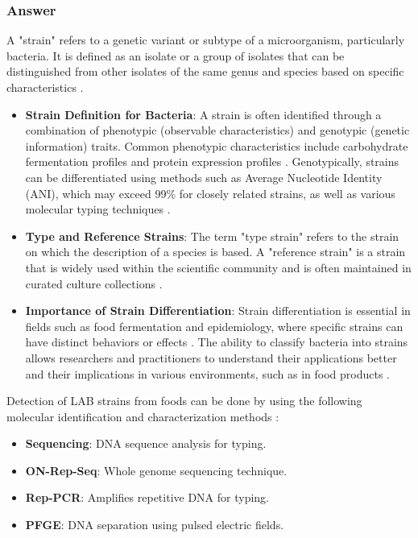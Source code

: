 \subsubsection*{Answer}
A "strain" refers to a genetic variant or subtype of a microorganism, particularly bacteria. It is defined as an isolate or a group of isolates that can be distinguished from other isolates of the same genus and species based on specific characteristics \cite*{LS08}.
\begin{itemize}
    \item \textbf{Strain Definition for Bacteria}:
    \subitem A strain is often identified through a combination of phenotypic (observable characteristics) and genotypic (genetic information) traits. Common phenotypic characteristics include carbohydrate fermentation profiles and protein expression profiles \cite*{LS09}.
    \subitem Genotypically, strains can be differentiated using methods such as Average Nucleotide Identity (ANI), which may exceed 99\% for closely related strains, as well as various molecular typing techniques \cite*{LS09}.
    \item \textbf{Type and Reference Strains}:
    \subitem The term "type strain" refers to the strain on which the description of a species is based. A "reference strain" is a strain that is widely used within the scientific community and is often maintained in curated culture collections \cite*{LS09}.
    \item \textbf{Importance of Strain Differentiation}:
    \subitem Strain differentiation is essential in fields such as food fermentation and epidemiology, where specific strains can have distinct behaviors or effects \cite*{LS09}. 
    \subitem The ability to classify bacteria into strains allows researchers and practitioners to understand their applications better and their implications in various environments, such as in food products \cite{LS09}.
\end{itemize}

Detection of LAB strains from foods can be done by using the following molecular identification and characterization methods \cite*{LS05}:
\begin{itemize}
    \item \textbf{Sequencing}: DNA sequence analysis for typing.
    \item \textbf{ON-Rep-Seq}: Whole genome sequencing technique.
    \item \textbf{Rep-PCR}: Amplifies repetitive DNA for typing.
    \item \textbf{PFGE}: DNA separation using pulsed electric fields.
\end{itemize}

